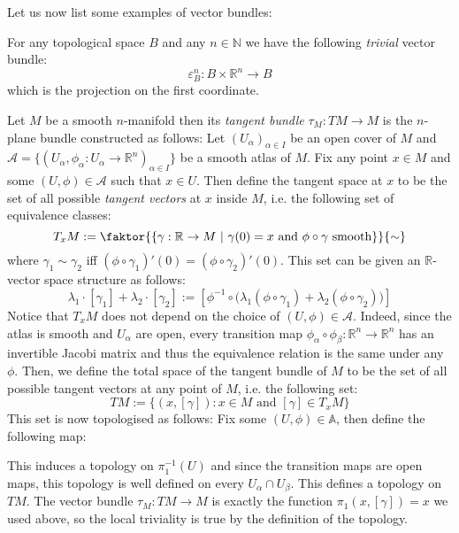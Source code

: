 Let us now list some examples of vector bundles:
\begin{examples}
\begin{i_enum}
\item For any topological space $B$ and any $n\in\mathbb{N}$ we have the following \emph{trivial} vector bundle:
\[\varepsilon_B^n:B\times\mathbb{R}^n\to B\]
which is the projection on the first coordinate.
\item Let $M$ be a smooth $n$-manifold then its \emph{tangent bundle} $\tau_M:TM\to M$ is the $n$-plane bundle constructed as follows: Let $(U_{\alpha})_{\alpha\in I}$ be an open cover of $M$ and $\mathcal{A}=\big\{(U_{\alpha},\phi_{\alpha}:U_{\alpha}\to\mathbb{R}^n)_{\alpha\in I}\big\}$ be a smooth atlas of $M$. Fix any point $x\in M$ and some $(U,\phi)\in\mathcal{A}$ such that $x\in U$. Then define the tangent space at $x$ to be the set of all possible \emph{tangent vectors} at $x$ inside $M$, i.e. the following set of equivalence classes:
\[T_xM:=\faktor{\left\{\gamma:\mathbb{R}\to M\ |\ \gamma(0)=x\text{ and }\phi\circ\gamma\text{ smooth}\right\}}{\sim}\]
where $\gamma_1\sim\gamma_2$ iff $(\phi\circ\gamma_1)'(0)=(\phi\circ\gamma_2)'(0)$. This set can be given an $\mathbb{R}$-vector space structure as follows:
\[\lambda_1\cdot[\gamma_1]+\lambda_2\cdot[\gamma_2]:=\left[\phi^{-1}\circ\big(\lambda_1(\phi\circ\gamma_1)+\lambda_2(\phi\circ\gamma_2)\big)\right]\]
Notice that $T_xM$ does not depend on the choice of $(U,\phi)\in\mathcal{A}$. Indeed, since the atlas is smooth and $U_{\alpha}$ are open, every transition map $\phi_{\alpha}\circ\phi_{\beta}:\mathbb{R}^n\to\mathbb{R}^n$ has an invertible Jacobi matrix and thus the equivalence relation is the same under any $\phi$. Then, we define the total space of the tangent bundle of $M$ to be the set of all possible tangent vectors at any point of $M$, i.e. the following set:
\[TM:=\big\{(x,[\gamma]):x\in M\text{ and }[\gamma]\in T_xM\big\}\]
This set is now topologised as follows: Fix some $(U,\phi)\in\mathbb{A}$, then define the following map:
\begin{center}
\end{center}
This induces a topology on $\pi_1^{-1}(U)$ and since the transition maps are open maps, this topology is well defined on every $U_{\alpha}\cap U_{\beta}$. This defines a topology on $TM$. The vector bundle $\tau_{M}:TM\to M$ is exactly the function $\pi_1(x,[\gamma])=x$ we used above, so the local triviality is true by the definition of the topology.

\end{i_enum}
\end{examples}
